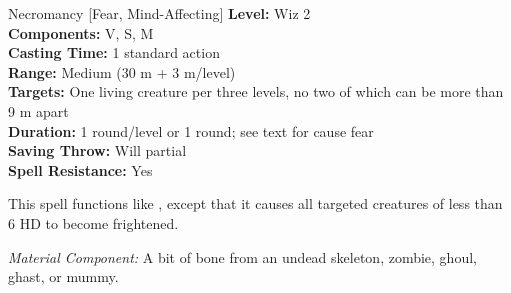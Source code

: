 {Necromancy [Fear, Mind-Affecting]}
{
	\textbf{Level:}
	Wiz 2\\
	\textbf{Components:}
	V, S, M\\
	\textbf{Casting Time:}
	1 standard action\\
	\textbf{Range:}
	Medium (30 m + 3 m/level)\\
	\textbf{Targets:}
	One living creature per three levels, no two of which can be more than 9 m apart\\
	\textbf{Duration:}
	1 round/level or 1 round; see text for cause fear\\
	\textbf{Saving Throw:}
	Will partial\\
	\textbf{Spell Resistance:}
	Yes\\
}
{
	This spell functions like , except that it causes all targeted creatures of less than 6 HD to become frightened.

	\textit{Material Component:}
	A bit of bone from an undead skeleton, zombie, ghoul, ghast, or mummy.

}
